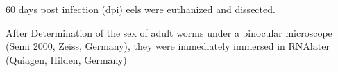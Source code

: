 60 days post infection (dpi) eels were euthanized and dissected.

After Determination of the sex of adult worms under a binocular
microscope (Semi 2000, Zeiss, Germany), they were immediately immersed
in RNAlater (Quiagen, Hilden, Germany)


 






